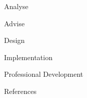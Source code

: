 \documentclass{matthijs}
\begin{document}
	\begin{hoofdstuk}{Analyse}

	\end{hoofdstuk}
	
	\begin{hoofdstuk}{Advise}

	\end{hoofdstuk}
	
	\begin{hoofdstuk}{Design}

	\end{hoofdstuk}
	
	\begin{hoofdstuk}{Implementation}

	\end{hoofdstuk}
	
	\begin{hoofdstuk}{Professional Development}

	\end{hoofdstuk}

	\begin{hoofdstuk}{References}

		\printbibliography[heading=none]

	\end{hoofdstuk}

	\makelastpage
\end{document}
